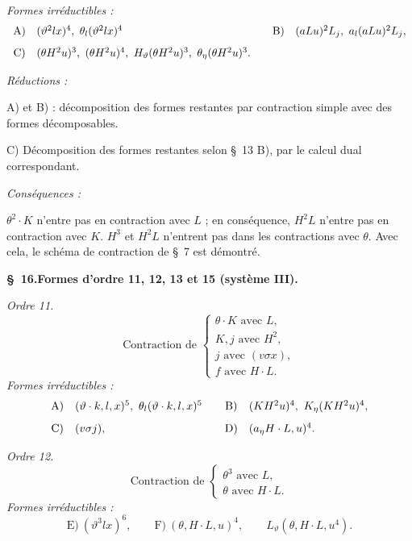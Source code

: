 \documentclass[11pt]{article}
\begin{document}
\noindent\emph{Formes irréductibles :}
\[
\begin{array}{c@{\quad}l@{\qquad}c@{\quad}l}
\text{A)}&(\vartheta^2lx)^4,
\ \theta_l(\vartheta^2lx)^4&
\text{B)}&(aLu)^2L_j,
\ a_l(aLu)^2L_j,\\[0.8em]
\text{C)}&(\theta H^2u)^3,
\ (\theta H^2u)^4,
\ H_\vartheta(\theta H^2u)^3,
\ \theta_\eta(\theta H^2u)^3.
\end{array}
\]

\noindent\emph{Réductions :}

A) et B) : décomposition des formes restantes par contraction simple avec des formes décomposables.

C) Décomposition des formes restantes selon \S\ 13 B), par le calcul dual correspondant.

\noindent\emph{Conséquences :}

$\theta^2\cdot K$ n'entre pas en contraction avec $L$ ; en conséquence, $H^2L$ n'entre pas en contraction avec $K$. $H^3$ et $H^2L$ n'entrent pas dans les contractions avec $\theta$. Avec cela, le schéma de contraction de \S\ 7 est démontré.

\begin{center}
\textbf{\S\ 16.\quad Formes d'ordre 11, 12, 13 et 15 (système III).}
\end{center}

\noindent\emph{Ordre 11.}
\[
\text{Contraction de }\left\{\begin{array}{l}
\theta\cdot K\text{ avec }L,\\
K,j\text{ avec }H^2,\\
j\text{ avec }(v\sigma x),\\
f\text{ avec }H\cdot L.
\end{array}\right.
\]
\noindent\emph{Formes irréductibles :}
\[
\begin{array}{c@{\quad}l@{\qquad}c@{\quad}l}
\text{A)}&(\vartheta\cdot k,l,x)^5,
\ \theta_l(\vartheta\cdot k,l,x)^5&
\text{B)}&(KH^2u)^4,
\ K_\eta(KH^2u)^4,\\[0.8em]
\text{C)}&(v\sigma j),&
\text{D)}&(a_\eta H\cdot L,u)^4.
\end{array}
\]

\noindent\emph{Ordre 12.}
\[
\text{Contraction de }\left\{\begin{array}{l}
\theta^3\text{ avec }L,\\
\theta\text{ avec }H\cdot L.
\end{array}\right.
\]
\noindent\emph{Formes irréductibles :}
\[
\text{E)}\ (\vartheta^3lx)^6,
\qquad
\text{F)}\ (\theta,H\cdot L,u)^4,
\qquad L_\vartheta(\theta,H\cdot L,u^4).
\]
\end{document}
